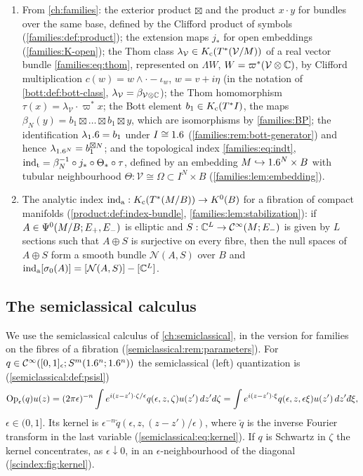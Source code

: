 \begin{enumerate}[label=(K\arabic*),leftmargin=*]
  where $z=e^{i\theta}$ is the variable on $\Sphere$.
\item\label{scindex:K-families} From \cref{ch:families}: the exterior product
  $\boxtimes$ and the product $x\cdot y$ for bundles over the same base, defined by
  the Clifford product of symbols (\cref{families:def:product}); the extension
  maps $j_*$ for open embeddings (\ref{families:K-open}); the Thom class
  $\lambda_{\mathcal V}\in K_{\mathrm{c}}(T^*(\mathcal V/M))$ of a real vector bundle
  \eqref{families:eq:thom}, represented on $\Lambda W$,
  $W=\varpi^*(\mathcal V\otimes\mathbb{C})$, by Clifford multiplication
  $c(w)=w\wedge\cdot-\iota_w$, $w=v+i\eta$ (in the notation of
  \cref{bott:def:bott-class}, $\lambda_{\mathcal V}=\beta_{\mathcal V\otimes\mathbb{C}}$);
  the Thom homomorphism $\tau(x)=\lambda_{\mathcal V}\cdot\varpi^*x$; the Bott
  element $b_1\in K_{\mathrm{c}}(T^*I)$, the maps $\beta_N(y)=b_1\boxtimes\dots\boxtimes
  b_1\boxtimes y$, which are isomorphisms by \ref{families:BP}; the
  identification $\lambda_1.6=b_1$ under $I\cong1.6$
  (\cref{families:rem:bott-generator}) and hence $\lambda_{1.6^N}=
  b_1^{\boxtimes N}$; and the topological index \eqref{families:eq:indt},
  $\operatorname{ind}_{\mathrm{t}}=\beta_N^{-1}\circ j_*\circ\Theta_*\circ\tau$, defined by an embedding
  $M\hookrightarrow1.6^N\times B$ with tubular neighbourhood
  $\Theta:\mathcal V\cong\Omega\subset I^N\times B$
  (\cref{families:lem:embedding}).
\item\label{scindex:K-inda} The analytic index $\operatorname{ind}_{\mathrm{a}}:K_{\mathrm{c}}(T^*(M/B))\to K^0(B)$
  for a fibration of compact manifolds (\cref{product:def:index-bundle},
  \cref{families:lem:stabilization}): if $A\in\Psi^{0}(M/B;E_+,E_-)$ is elliptic
  and $S:\mathbb{C}^L\to\mathcal{C}^\infty(M;E_-)$ is given by $L$ sections such that $A\oplus S$ is
  surjective on every fibre, then the null spaces of $A\oplus S$ form a smooth
  bundle $\mathcal N(A,S)$ over $B$ and $\operatorname{ind}_{\mathrm{a}}[\sigma_0(A)]=
  [\mathcal N(A,S)]-[\mathbb{C}^L]$.
\end{enumerate}

\subsection{The semiclassical calculus}
We use the semiclassical calculus of \cref{ch:semiclassical}, in the version for
families on the fibres of a fibration (\cref{semiclassical:rem:parameters}). For
$q\in\mathcal{C}^\infty([0,1]_\epsilon;S^{m}(1.6^n;1.6^n))$ the semiclassical (left)
quantization is (\cref{semiclassical:def:psisl})
\begin{equation}\label{scindex:eq:Ope}
  \Ope(q)u(z)=(2\pi\epsilon)^{-n}\int e^{i(z-z')\cdot\zeta/\epsilon}
  q(\epsilon,z,\zeta)u(z')\,dz'd\zeta
  =\int e^{i(z-z')\cdot\xi}q(\epsilon,z,\epsilon\xi)u(z')\,dz'\,\dbar\xi,
\end{equation}
$\epsilon\in(0,1]$. Its kernel is $\epsilon^{-n}\check q(\epsilon,z,(z-z')/
\epsilon)$, where $\check q$ is the inverse Fourier transform in the last
variable (\eqref{semiclassical:eq:kernel}). If $q$ is Schwartz in $\zeta$ the
kernel concentrates, as $\epsilon\downarrow0$, in an $\epsilon$-neighbourhood of
the diagonal (\cref{scindex:fig:kernel}).

